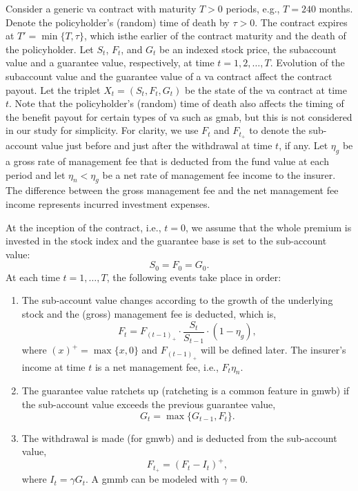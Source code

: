 Consider a generic \gls{va} contract with maturity $T>0$ periods, e.g., $T=240$ months.
Denote the policyholder's (random) time of death by $\tau>0$.
The contract expires at $T'=\min\{T,\tau\}$, which isthe earlier of the contract maturity and the death of the policyholder.
Let $S_t$, $F_t$, and $G_t$ be an indexed stock price, the subaccount value and a guarantee value, respectively, at time $t=1,2,\ldots,T$.
Evolution of the subaccount value and the guarantee value of a \gls{va} contract affect the contract payout.
Let the triplet $X_t = (S_t, F_t, G_t)$ be the state of the \gls{va} contract at time $t$.
Note that the policyholder's (random) time of death also affects the timing of the benefit payout for certain types of \gls{va} such as \gls{gmab}, but this is not considered in our study for simplicity.
For clarity, we use $F_t$ and $F_{t_+}$ to denote the sub-account value just before and just after the withdrawal at time $t$, if any.
Let $\eta_g$ be a gross rate of management fee that is deducted from the fund value at each period and let $\eta_n < \eta_g$ be a net rate of management fee income to the insurer.
The difference between the gross management fee and the net management fee income represents incurred investment expenses.

At the inception of the contract, i.e., $t=0$, we assume that the whole premium is invested in the stock index and the guarantee base is set to the sub-account value:
\begin{equation*}
    S_0=F_0=G_0.
\end{equation*}
At each time $t=1,\ldots,T$, the following events take place in order:
\begin{enumerate}
    \item The sub-account value changes according to the growth of the underlying stock and the (gross) management fee is deducted, which is, 
        \begin{equation*}
            F_t = F_{(t-1)_+}\cdot\frac{S_{t}}{S_{t-1}}\cdot(1-\eta_g),
        \end{equation*} 
    where $(x)^+=\max\{x,0\}$ and $F_{(t-1)_+}$ will be defined later. The insurer's income at time $t$ is a net management fee, i.e., $F_t\eta_n$. 

    \item The guarantee value ratchets up (ratcheting is a common feature in \gls{gmwb}) if the sub-account value exceeds the previous guarantee value,
        \begin{equation*}
            G_t = \max\{G_{t-1},F_t\}.
        \end{equation*} 

    \item The withdrawal is made (for \gls{gmwb}) and is deducted from the sub-account value,
        \begin{equation*}
            F_{t_+} = (F_t - I_t)^+,
        \end{equation*} 
    where $I_t = \gamma G_t$. A \gls{gmmb} can be modeled with $\gamma = 0$.
\end{enumerate}

